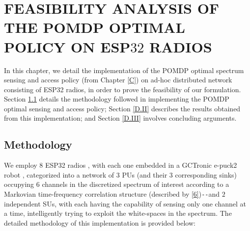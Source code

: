 \chapter{FEASIBILITY ANALYSIS OF THE POMDP OPTIMAL POLICY ON ESP$32$ RADIOS}\label{D}
In this chapter, we detail the implementation of the POMDP optimal spectrum sensing and access policy (from Chapter \ref{C}) on ad-hoc distributed network consisting of ESP32 radios, in order to prove the feasibility of our formulation. Section \ref{D.I} details the methodology followed in implementing the POMDP optimal sensing and access policy; Section \ref{D.II} describes the results obtained from this implementation; and Section \ref{D.III} involves concluding arguments.

\section{Methodology}\label{D.I}
We employ $8$ ESP32 radios \cite{Espressif:ESP32}, with each one embedded in a GCTronic e-puck2 robot \cite{GCTronic:epuck2}, categorized into a network of $3$ PUs (and their $3$ corresponding sinks) occupying $6$ channels in the discretized spectrum of interest according to a Markovian time-frequency correlation structure (described by \eqref{6})\texttt{-{}-}and $2$ independent SUs, with each having the capability of sensing only one channel at a time, intelligently trying to exploit the white-spaces in the spectrum. The detailed methodology of this implementation is provided below:
